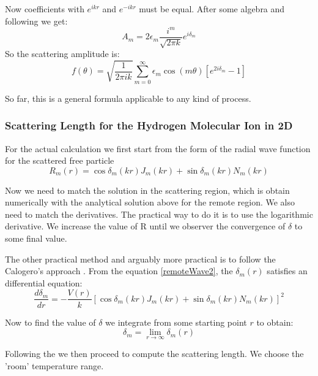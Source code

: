 Now coefficients with $ e^{ikr} $ and $ e^{-ikr} $ must be equal. After some algebra and following \cite{2DScatter2} we get:
\begin{equation}\label{AandDelta}
A_m = 2\epsilon_m \frac{i^m}{\sqrt{2\pi k}}e^{i\delta_m}
\end{equation}
So the scattering amplitude is:
\begin{equation}
f(\theta) = \sqrt{\frac{1}{2\pi i k}}\sum_{m=0}^{\infty}{\epsilon_m\cos(m\theta)\left[e^{2i\delta_m}-1\right]}
\end{equation}

So far, this is a general formula applicable to any kind of process.

\subsubsection{Scattering Length for the Hydrogen Molecular Ion in 2D}

For the actual calculation we first start from the form of the radial wave function for the scattered free particle
\begin{equation}\label{remoteWave2}
    R_m(r) = \cos \delta_m(kr) J_m(kr) + \sin \delta_m(kr) N_m(kr)
\end{equation}
 
Now we need to match the solution in the scattering region, which is obtain numerically with the analytical solution above for the remote region. We also need to match the derivatives. The practical way to do it is to use the logarithmic derivative. We increase the value of R until we observer the convergence of $ \delta $ to some final value.

The other practical method and arguably more practical is to follow the Calogero's approach \cite{Calogero}.
From the equation \eqref{remoteWave2}, the $ \delta_m(r) $ satisfies an differential equation:
\begin{equation}\label{delta_eq}
    \frac{d\delta_m}{dr} = -\frac{V(r)}{k}\left[\cos \delta_m(kr) J_m(kr) + \sin \delta_m(kr) N_m(kr)\right]^2
\end{equation}

Now to find the value of $ \delta $ we integrate from some starting point $ r $ to obtain:
\begin{equation}\label{delta_r}
    \delta_m = \lim_{r \rightarrow \infty}\delta_m(r) 
\end{equation}

Following the \cite{Dalgarno1953} we then proceed to compute the scattering length. We choose the 'room' temperature range.

